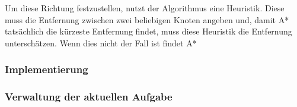 Um diese Richtung festzustellen, nutzt der Algorithmus eine Heuristik.
Diese muss die Entfernung zwischen zwei beliebigen Knoten angeben und, damit A* tatsächlich die kürzeste Entfernung
findet, muss diese Heuristik die Entfernung unterschätzen.
Wenn dies nicht der Fall ist findet A*
\subsubsection{Implementierung}
\subsubsection{Verwaltung der aktuellen Aufgabe}
